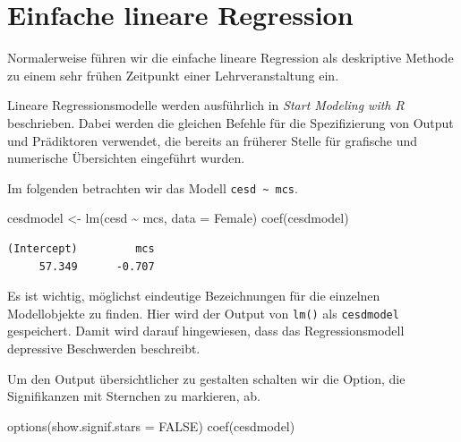 \documentclass[
  ngerman,
]{scrbook}
\newenvironment{Shaded}{\begin{snugshade}}{\end{snugshade}}
\newcommand{\AttributeTok}[1]{\textcolor[rgb]{0.77,0.63,0.00}{#1}}
\newcommand{\ConstantTok}[1]{\textcolor[rgb]{0.00,0.00,0.00}{#1}}
\newcommand{\FunctionTok}[1]{\textcolor[rgb]{0.00,0.00,0.00}{#1}}
\newcommand{\NormalTok}[1]{#1}
\newcommand{\OtherTok}[1]{\textcolor[rgb]{0.56,0.35,0.01}{#1}}
\newcommand{\SpecialCharTok}[1]{\textcolor[rgb]{0.00,0.00,0.00}{#1}}
\newenvironment{note}[1]
  {
  \begin{itemize}
  \renewcommand{\labelitemi}{
    \raisebox{-.01\height}[0pt][0pt]{
      {\setkeys{Gin}{width=7em,keepaspectratio}
        {\normalsize \textcolor{dark-fom-green}\faHashtag}}
        }
  }
  \begin{blackbox}
   \item
    }
    {
  \end{blackbox}
  \end{itemize}
  }
\begin{document}
\hypertarget{einfache-lineare-regression}{%
\section{Einfache lineare Regression}\label{einfache-lineare-regression}}

\begin{note}{note}
Normalerweise führen wir die einfache lineare Regression als deskriptive Methode zu einem sehr frühen Zeitpunkt einer Lehrveranstaltung ein.

\end{note}

Lineare Regressionsmodelle werden ausführlich in \emph{Start Modeling with R} \autocite{TeachingR} beschrieben.
Dabei werden die gleichen Befehle für die Spezifizierung von Output und Prädiktoren verwendet, die bereits an früherer Stelle für grafische und numerische Übersichten eingeführt wurden.

Im folgenden betrachten wir das Modell \texttt{cesd\ \textasciitilde{}\ mcs}.

\begin{Shaded}
\begin{Highlighting}[]
\NormalTok{cesdmodel }\OtherTok{\textless{}{-}} \FunctionTok{lm}\NormalTok{(cesd }\SpecialCharTok{\textasciitilde{}}\NormalTok{ mcs, }\AttributeTok{data =}\NormalTok{ Female)}
\FunctionTok{coef}\NormalTok{(cesdmodel)}
\end{Highlighting}
\end{Shaded}

\begin{verbatim}
(Intercept)         mcs 
     57.349      -0.707 
\end{verbatim}

\begin{note}{note}
Es ist wichtig, möglichst eindeutige Bezeichnungen für die einzelnen Modellobjekte zu finden. Hier wird der Output von \texttt{lm()} als \texttt{cesdmodel} gespeichert.
Damit wird darauf hingewiesen, dass das Regressionsmodell depressive Beschwerden beschreibt.

\end{note}

Um den Output übersichtlicher zu gestalten schalten wir die Option, die Signifikanzen mit Sternchen zu markieren, ab.

\begin{Shaded}
\begin{Highlighting}[]
\FunctionTok{options}\NormalTok{(}\AttributeTok{show.signif.stars =} \ConstantTok{FALSE}\NormalTok{)}
\FunctionTok{coef}\NormalTok{(cesdmodel)}
\end{Highlighting}
\end{Shaded}
\end{document}
